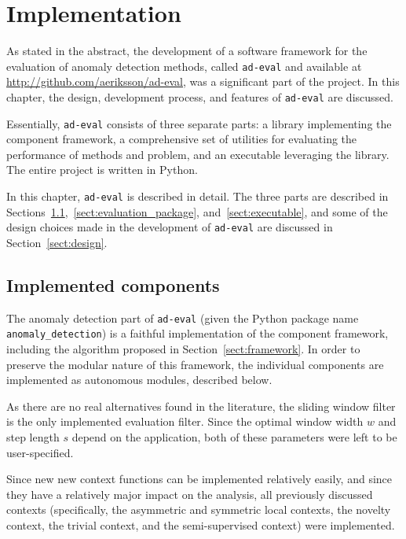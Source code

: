\section{Implementation}
\label{ch:implementation}

As stated in the abstract, the development of a software framework for the evaluation of anomaly detection methods, called \texttt{ad-eval} and available at \url{http://github.com/aeriksson/ad-eval}, was a significant part of the project. In this chapter, the design, development process, and features of \texttt{ad-eval} are discussed.

Essentially, \texttt{ad-eval} consists of three separate parts: a library implementing the component framework, a comprehensive set of utilities for evaluating the performance of methods and problem, and an executable leveraging the library. The entire project is written in Python.

In this chapter, \texttt{ad-eval} is described in detail. The three parts are described in Sections~\ref{sect:implemented_problems},~\ref{sect:evaluation_package}, and~\ref{sect:executable}, and some of the design choices made in the development of \texttt{ad-eval} are discussed in Section~\ref{sect:design}.

\subsection{Implemented components}
\label{sect:implemented_problems}

The anomaly detection part of \texttt{ad-eval} (given the Python package name \texttt{anomaly\_detection}) is a faithful implementation of the component framework, including the algorithm proposed in Section~\ref{sect:framework}. In order to preserve the modular nature of this framework, the individual components are implemented as autonomous modules, described below.

As there are no real alternatives found in the literature, the sliding window filter is the only implemented evaluation filter. Since the optimal window width $w$ and step length $s$ depend on the application, both of these parameters were left to be user-specified.

Since new new context functions can be implemented relatively easily, and since they have a relatively major impact on the analysis, all previously discussed contexts (specifically, the asymmetric and symmetric local contexts, the novelty context, the trivial context, and the semi-supervised context) were implemented.

